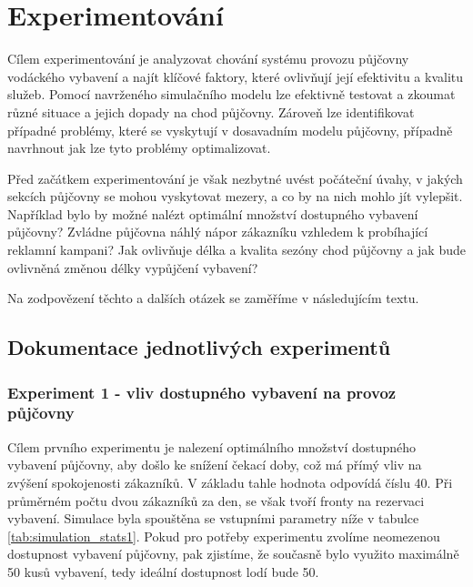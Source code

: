 \documentclass[a4paper, 12pt, hidelinks]{article}
\begin{document}
\newpage 

\section{Experimentování}
Cílem experimentování je analyzovat chování systému provozu půjčovny vodáckého vybavení a najít klíčové faktory, které ovlivňují její efektivitu a kvalitu služeb. Pomocí navrženého simulačního modelu lze efektivně testovat a zkoumat různé situace a jejich dopady na chod půjčovny. Zároveň lze identifikovat případné problémy, které se vyskytují v dosavadním modelu půjčovny, případně navrhnout jak lze tyto problémy optimalizovat. 

Před začátkem experimentování je však nezbytné uvést počáteční úvahy, v jakých sekcích půjčovny se mohou vyskytovat mezery, a co by na nich mohlo jít vylepšit. Například bylo by možné nalézt optimální množství dostupného vybavení půjčovny? Zvládne půjčovna náhlý nápor zákazníku vzhledem k probíhající reklamní kampani? Jak ovlivňuje délka a kvalita sezóny chod půjčovny a jak bude ovlivněná změnou délky vypůjčení vybavení?

Na zodpovězení těchto a dalších otázek se zaměříme v následujícím textu.

\subsection{Dokumentace jednotlivých experimentů}
\subsubsection{Experiment 1 - vliv dostupného vybavení na provoz půjčovny}
Cílem prvního experimentu je nalezení optimálního množství dostupného vybavení půjčovny, aby došlo ke snížení čekací doby, což má přímý vliv na zvýšení spokojenosti zákazníků. V základu tahle hodnota odpovídá číslu 40. Při průměrném počtu dvou zákazníků za den, se však tvoří fronty na rezervaci vybavení. Simulace byla spouštěna se vstupními parametry níže v tabulce \ref{tab:simulation_stats1}. Pokud pro potřeby experimentu zvolíme neomezenou dostupnost vybavení půjčovny, pak zjistíme, že současně bylo využito maximálně 50 kusů vybavení, tedy ideální dostupnost lodí bude 50. 
\end{document}
